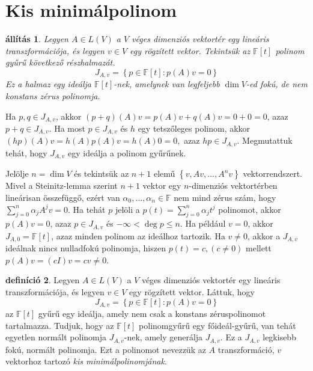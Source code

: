 \documentclass[9pt, a4paper, showtrims]{memoir}
\makeatletter
\renewenvironment{proof}[1][\proofname]
    {\par\pushQED{\qed}%
    \normalfont \topsep6\p@\@plus6\p@\relax
    \trivlist
    \item[\hskip\labelsep
        \itshape
    #1\@addpunct{:}]\ignorespaces}
    {\popQED\endtrivlist\@endpefalse}
\theoremstyle{plain}
\newtheorem{proposition}{állítás}[chapter]
\theoremstyle{remark}
\theoremstyle{definition}
\newtheorem{definition}[proposition]{definíció}
\makeatother
\begin{document}
    \section{Kis minimálpolinom}
    \begin{proposition}
        Legyen $A\in L\left( V \right)$ a $V$ véges dimenziós vektortér egy lineáris transzformációja,
        és legyen $v\in V$ egy rögzített vektor.
        Tekintsük az 
        $\mathbb{F}\left[ t \right]$ polinom gyűrű következő részhalmazát.
        \[
            J_{A,v}
            =
            \left\{ p\in\mathbb{F}\left[ t \right]:p\left( A \right)v=0 \right\}
        \]
        Ez a halmaz egy ideálja $\mathbb{F}\left[ t \right]$-nek, 
        amelynek van legfeljebb $\dim V$-ed fokú, de nem konstans zérus polinomja.
    \end{proposition}
    \begin{proof}
        Ha $p,q\in J_{A,v}$, 
        akkor 
        $\left( p+q \right)(A)v=p\left( A \right)v+q\left( A \right)v=0+0=0$,
        azaz $p+q\in J_{A,v}$. 
        Ha most $p\in J_{A,v}$ és $h$ egy tetszőleges polinom,
        akkor 
        $
        \left( hp \right)(A)v=h\left( A \right)p\left( A \right)v=h\left( A \right)0=0,
        $
        azaz $hp\in J_{A,v}$. 
        Megmutattuk tehát, hogy $J_{A,v}$ egy ideálja a polinom gyűrűnek.

        Jelölje $n=\dim V$ és tekintsük az $n+1$ elemű
        $\left\{ v,Av,\dots,A^nv \right\}$ vektorrendszert.
        Mivel a Steinitz-lemma szerint  
        $n+1$ vektor egy $n$-dimenziós vektortérben lineárisan összefüggő,
        ezért van
        $\alpha_0,\dots,\alpha_n\in\mathbb{F}$ nem mind zérus szám, hogy
        $\sum_{j=0}^n\alpha_jA^jv=0$.
        Ha tehát $p$ jelöli a $p\left( t \right)=\sum_{j=0}^n\alpha_jt^j$ polinomot,
        akkor
        $p\left( A \right)v=0$, azaz $p\in J_{A,v}$ és $-\infty<\deg p\leq n$.
    \end{proof}
    Ha például $v=0$, akkor $J_{A,0}=\mathbb{F}\left[ t \right]$, azaz minden polinom
    az ideálhoz tartozik.
    Ha $v\neq 0$, 
    akkor a $J_{A,v}$ ideálnak nincs nulladfokú polinomja, 
    hiszen $p(t)=c, (c\neq 0)$ mellett
    $p\left( A \right)v=(cI)v=cv\neq 0$.

    \begin{definition}
        Legyen $A\in L\left( V \right)$ a $V$ véges dimenziós vektortér egy lineáris transzformációja,
        és legyen $v\in V$ egy rögzített vektor.
        Láttuk, hogy
        \[
            J_{A,v}
            =
            \left\{ p\in\mathbb{F}\left[ t \right]:p\left( A \right)v=0 \right\}
        \]
        az $\mathbb{F}\left[ t \right]$ gyűrű egy ideálja, amely nem csak a konstans zéruspolinomot tartalmazza.
        Tudjuk, hogy az $\mathbb{F}\left[ t \right]$ polinomgyűrű egy főideál-gyűrű,
        van tehát egyetlen normált polinomja $J_{A,v}$-nek, amely generálja $J_{A,v}$.
        Ez a $J_{A,v}$ legkisebb fokú, normált polinomja.
        Ezt a polinomot nevezzük az $A$ transzformáció, $v$ vektorhoz tartozó
        \emph{kis minimálpolinomjának}.
    \end{definition}
\end{document}
